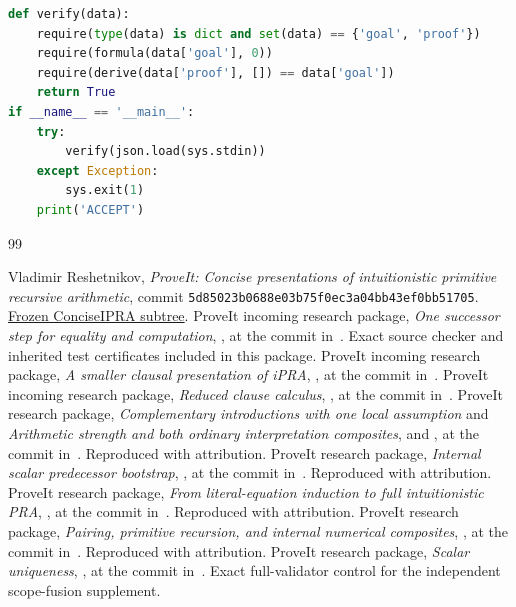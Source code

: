 \documentclass[11pt,letterpaper]{article}
\theoremstyle{definition}
\begin{document}
\begin{lstlisting}[language=Python]
def verify(data):
    require(type(data) is dict and set(data) == {'goal', 'proof'})
    require(formula(data['goal'], 0))
    require(derive(data['proof'], []) == data['goal'])
    return True
if __name__ == '__main__':
    try:
        verify(json.load(sys.stdin))
    except Exception:
        sys.exit(1)
    print('ACCEPT')
\end{lstlisting}

\clearpage
\begin{thebibliography}{99}
\raggedright
{}
Vladimir Reshetnikov, \emph{ProveIt: Concise presentations of
intuitionistic primitive recursive arithmetic}, commit
\texttt{5d85023b0688e03b75f0ec3a04bb43ef0bb51705}.
\href{https://github.com/VladimirReshetnikov/ProveIt/tree/5d85023b0688e03b75f0ec3a04bb43ef0bb51705/Logic/PrimitiveRecursiveArithmetic/ConciseIPRA}{Frozen ConciseIPRA subtree}.
ProveIt incoming research package, \emph{One successor step for equality
and computation}, , at the
commit in~\cite{baseline}. Exact source checker and inherited test
certificates included in this package.
ProveIt incoming research package, \emph{A smaller clausal presentation
of iPRA}, , at
the commit in~\cite{baseline}.
ProveIt incoming research package, \emph{Reduced clause calculus},
, at the
commit in~\cite{baseline}.
ProveIt research package, \emph{Complementary introductions with one
local assumption} and \emph{Arithmetic strength and both ordinary
interpretation composites},
and , at the commit in~\cite{baseline}.
Reproduced with attribution.
ProveIt research package, \emph{Internal scalar predecessor bootstrap},
, at the
commit in~\cite{baseline}. Reproduced with attribution.
ProveIt research package, \emph{From literal-equation induction to full
intuitionistic PRA},
, at
the commit in~\cite{baseline}. Reproduced with attribution.
ProveIt research package, \emph{Pairing, primitive recursion, and internal
numerical composites},
, at
the commit in~\cite{baseline}. Reproduced with attribution.
ProveIt research package, \emph{Scalar uniqueness},
, at the
commit in~\cite{baseline}. Exact full-validator control for the independent
scope-fusion supplement.
\end{thebibliography}
\end{document}
